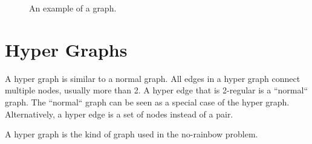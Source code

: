\documentclass[msc,lith,english]{liuthesis}
\begin{document}
\begin{center}
\begin{figure}[h!]
\centering
{}
  \caption{An example of a graph.}
  \label{figGraphExample}
\end{figure}
\end{center}


\section{Hyper Graphs}
A hyper graph is similar to a normal graph.
All edges in a hyper graph connect multiple nodes, usually more than 2.
A hyper edge that is 2-regular is a ``normal`` graph.
The ``normal`` graph can be seen as a special case of the hyper graph.
Alternatively, a hyper edge is a set of nodes instead of a pair.

A hyper graph is the kind of graph used in the no-rainbow problem.
\end{document}
